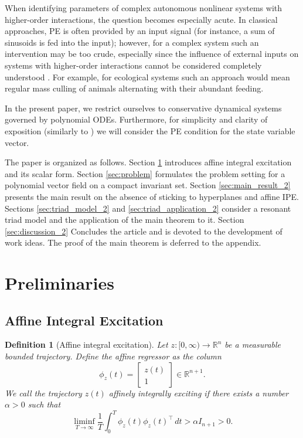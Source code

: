 \documentclass[11pt]{article}
\newcommand{\R}{\mathbb{R}}
\newcommand{\dd}{\,d}
\theoremstyle{thmstyleone}
\theoremstyle{thmstyletwo}
\theoremstyle{thmstylethree}
\newtheorem{definition}{Definition}
\begin{document}
When identifying parameters of complex autonomous nonlinear systems with higher-order interactions, the question becomes especially acute. In classical approaches, PE is often provided by an input signal (for instance, a sum of sinusoids is fed into the input); however, for a complex system such an intervention may be too crude, especially since the influence of external inputs on systems with higher-order interactions cannot be considered completely understood \cite{jafari2024synchronization}. For example, for ecological systems such an approach would mean regular mass culling of animals alternating with their abundant feeding.

In the present paper, we restrict ourselves to conservative dynamical systems governed by polynomial ODEs. Furthermore, for simplicity and clarity of exposition (similarly to \cite{PadoanScarciottiAstolfi2017}) we will consider the PE condition for the state variable vector.

The paper is organized as follows. Section \ref{sec:preliminaries} introduces affine integral excitation and its scalar form. Section \ref{sec:problem} formulates the problem setting for a polynomial vector field on a compact invariant set. Section \ref{sec:main_result_2} presents the main result on the absence of sticking to hyperplanes and affine IPE. Sections \ref{sec:triad_model_2} and \ref{sec:triad_application_2} consider a resonant triad model and the application of the main theorem to it. Section \ref{sec:discussion_2} Concludes the article and is devoted to the development of work ideas. The proof of the main theorem is deferred to the appendix.




\section{Preliminaries}
\label{sec:preliminaries}


\subsection{Affine Integral Excitation}


\begin{definition}[Affine integral excitation]
Let $z:[0,\infty)\to\R^n$ be a measurable bounded trajectory. Define the affine regressor as the column
\[
    \phi_z(t)=\begin{bmatrix} z(t) \\ 1 \end{bmatrix}\in\R^{n+1}.
\]
We call the trajectory $z(t)$ \emph{affinely integrally exciting} if there exists a number $\alpha>0$ such that
\begin{equation}\label{eq:ipe_definition_2}
    \liminf_{T\to\infty}
    \frac1T\int_0^T \phi_z(t)\phi_z(t)^\top\dd t
    > \alpha I_{n+1}>0.
\end{equation}

\end{definition}
\end{document}
